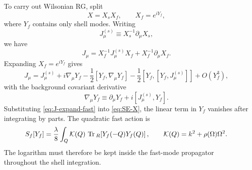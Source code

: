 \documentclass[aps,prx,preprint,amsmath,amssymb]{revtex4-2}
\newcommand{\Tr}{{\rm \, Tr\,}}
\begin{document}
To carry out Wilsonian RG, split
\begin{equation}\label{eq:X-split}
X=X_s X_f,
\qquad
X_f=e^{iY_f},
\end{equation}
where \(Y_f\) contains only shell modes.  Writing
\begin{equation}
J_\mu^{(s)}\equiv X_s^{-1}\partial_\mu X_s,
\end{equation}
we have
\begin{equation}
J_\mu
=
X_f^{-1}J_\mu^{(s)}X_f+X_f^{-1}\partial_\mu X_f.
\end{equation}
Expanding \(X_f=e^{iY_f}\) gives
\begin{equation}\label{eq:J-expand-fast}
J_\mu
=
J_\mu^{(s)}
+i\nabla_\mu Y_f
-\frac{1}{2}[Y_f,\nabla_\mu Y_f]
-\frac{1}{2}[Y_f,[Y_f,J_\mu^{(s)}]]
+O(Y_f^3),
\end{equation}
with the background covariant derivative
\begin{equation}
\nabla_\mu Y_f \equiv \partial_\mu Y_f + i[J_\mu^{(s)},Y_f].
\end{equation}
Substituting \eqref{eq:J-expand-fast} into \eqref{eq:SE-X}, the linear term in
\(Y_f\) vanishes after integrating by parts.  The quadratic fast action is
\begin{equation}\label{eq:S-fast}
S_f[Y_f]
=
\frac{\lambda}{8}\int_Q
\mathcal K(Q)\,
\Tr_R\!\left[Y_f(-Q)Y_f(Q)\right],
\qquad
\mathcal K(Q)=k^2+\rho(\Omega)\Omega^2.
\end{equation}
The logarithm must therefore be kept inside the fast-mode propagator throughout
the shell integration.
\end{document}
